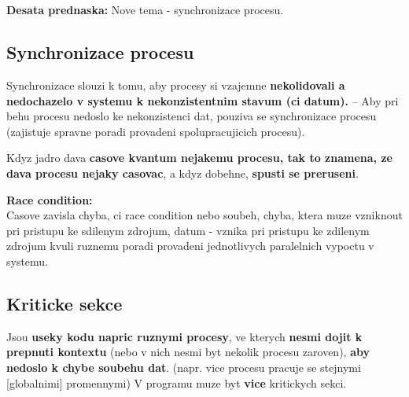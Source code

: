 \documentclass[a4paper, 11pt]{article}
\begin{document}
\newpage

\section{}
\textbf{Desata prednaska:} Nove tema - synchronizace procesu.
\subsection{Synchronizace procesu}
Synchronizace slouzi k tomu, aby procesy si vzajemne \textbf{nekolidovali a nedochazelo v systemu k nekonzistentnim stavum (ci datum).} -- Aby pri behu procesu nedoslo ke nekonzistenci dat, pouziva se synchronizace procesu (zajistuje spravne poradi provadeni spolupracujicich procesu).

Kdyz jadro dava \textbf{casove kvantum nejakemu procesu, tak to znamena, ze dava procesu nejaky casovac}, a kdyz dobehne, \textbf{spusti se preruseni}.

\textbf{Race condition:} \\
Casove zavisla chyba, ci race condition nebo soubeh, chyba, ktera muze vzniknout pri pristupu ke sdilenym zdrojum, datum - vznika pri pristupu ke zdilenym zdrojum kvuli ruznemu poradi provadeni jednotlivych paralelnich vypoctu v systemu. \\

\subsection{Kriticke sekce}
Jsou \textbf{useky kodu napric ruznymi procesy}, ve kterych \textbf{nesmi dojit k prepnuti kontextu} (nebo v nich nesmi byt nekolik procesu zaroven), \textbf{aby nedoslo k chybe soubehu dat}. (napr. vice procesu pracuje se stejnymi [globalnimi] promennymi) V programu muze byt \textbf{vice} kritickych sekci.
\end{document}
